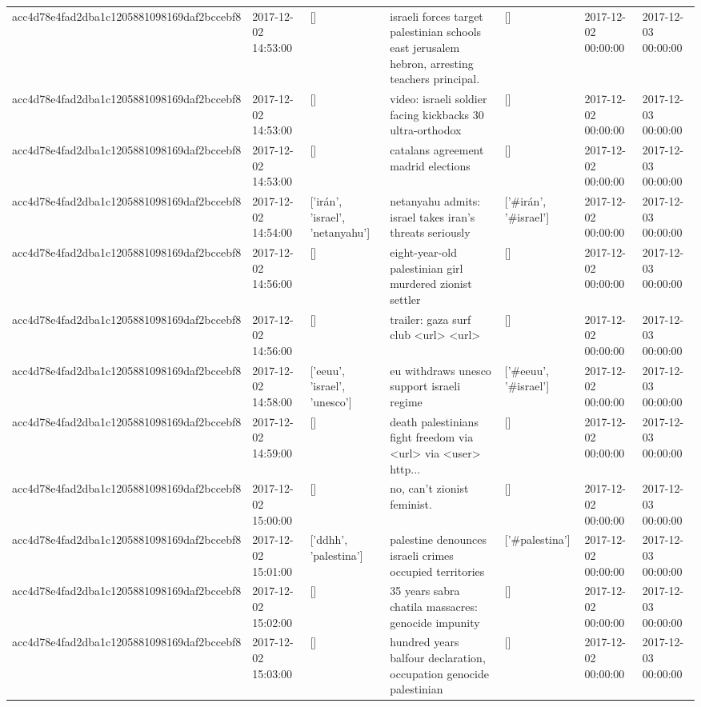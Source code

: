 \begin{tabular}{lllllll}
acc4d78e4fad2dba1c1205881098169daf2bccebf8 & 2017-12-02 14:53:00 & [] & israeli forces target palestinian schools east jerusalem hebron, arresting teachers principal. & [] & 2017-12-02 00:00:00 & 2017-12-03 00:00:00 \\
acc4d78e4fad2dba1c1205881098169daf2bccebf8 & 2017-12-02 14:53:00 & [] & video: israeli soldier facing kickbacks 30 ultra-orthodox & [] & 2017-12-02 00:00:00 & 2017-12-03 00:00:00 \\
acc4d78e4fad2dba1c1205881098169daf2bccebf8 & 2017-12-02 14:53:00 & [] & catalans agreement madrid elections & [] & 2017-12-02 00:00:00 & 2017-12-03 00:00:00 \\
acc4d78e4fad2dba1c1205881098169daf2bccebf8 & 2017-12-02 14:54:00 & ['irán', 'israel', 'netanyahu'] & netanyahu admits: israel takes iran's threats seriously & ['#irán', '#israel'] & 2017-12-02 00:00:00 & 2017-12-03 00:00:00 \\
acc4d78e4fad2dba1c1205881098169daf2bccebf8 & 2017-12-02 14:56:00 & [] & eight-year-old palestinian girl murdered zionist settler & [] & 2017-12-02 00:00:00 & 2017-12-03 00:00:00 \\
acc4d78e4fad2dba1c1205881098169daf2bccebf8 & 2017-12-02 14:56:00 & [] & trailer: gaza surf club <url> <url> & [] & 2017-12-02 00:00:00 & 2017-12-03 00:00:00 \\
acc4d78e4fad2dba1c1205881098169daf2bccebf8 & 2017-12-02 14:58:00 & ['eeuu', 'israel', 'unesco'] & eu withdraws unesco support israeli regime & ['#eeuu', '#israel'] & 2017-12-02 00:00:00 & 2017-12-03 00:00:00 \\
acc4d78e4fad2dba1c1205881098169daf2bccebf8 & 2017-12-02 14:59:00 & [] & death palestinians fight freedom via <url> via <user> http... & [] & 2017-12-02 00:00:00 & 2017-12-03 00:00:00 \\
acc4d78e4fad2dba1c1205881098169daf2bccebf8 & 2017-12-02 15:00:00 & [] & no, can't zionist feminist. & [] & 2017-12-02 00:00:00 & 2017-12-03 00:00:00 \\
acc4d78e4fad2dba1c1205881098169daf2bccebf8 & 2017-12-02 15:01:00 & ['ddhh', 'palestina'] & palestine denounces israeli crimes occupied territories & ['#palestina'] & 2017-12-02 00:00:00 & 2017-12-03 00:00:00 \\
acc4d78e4fad2dba1c1205881098169daf2bccebf8 & 2017-12-02 15:02:00 & [] & 35 years sabra chatila massacres: genocide impunity & [] & 2017-12-02 00:00:00 & 2017-12-03 00:00:00 \\
acc4d78e4fad2dba1c1205881098169daf2bccebf8 & 2017-12-02 15:03:00 & [] & hundred years balfour declaration, occupation genocide palestinian & [] & 2017-12-02 00:00:00 & 2017-12-03 00:00:00 \\

\end{tabular}
